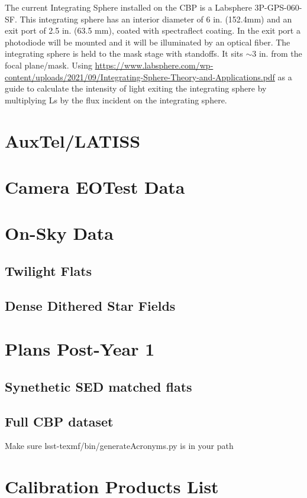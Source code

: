 \documentclass[SE,authoryear,lsstdraft,toc]{lsstdoc}
\begin{document}
The current Integrating Sphere installed on the CBP is a Labsphere 3P-GPS-060-SF. 
This integrating sphere has an interior diameter of 6 in. (152.4mm) and an exit port of 2.5 in. (63.5 mm), coated with spectraflect coating. 
In the exit port a photodiode will be mounted and it will be illuminated by an optical fiber.
The integrating sphere is held to the mask stage with standoffs. 
It sits $\sim 3$ in. from the focal plane/mask. 
Using \url{https://www.labsphere.com/wp-content/uploads/2021/09/Integrating-Sphere-Theory-and-Applications.pdf} as a guide to calculate the intensity of light exiting the integrating sphere by multiplying Ls by the flux incident on the integrating sphere.

\section{AuxTel/LATISS}

\section{Camera EOTest Data}

\section{On-Sky Data}
\subsection{Twilight Flats}
\subsection{Dense Dithered Star Fields}

\section{Plans Post-Year 1}
\subsection{Synethetic SED matched flats}
\subsection{Full CBP dataset}


 Make sure lsst-texmf/bin/generateAcronyms.py is in your path
\appendix
\section{Calibration Products List}
\end{document}
